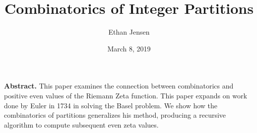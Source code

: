 \documentclass[12pt]{article}
\title{Combinatorics of Integer Partitions}
\author{Ethan Jensen}
\date{March 8, 2019}
\begin{document}
	\maketitle

\textbf{Abstract.} This paper examines the connection between combinatorics and positive even values of the Riemann Zeta function. This paper expands on work done by Euler in 1734 in solving the Basel problem. We show how the combinatorics of partitions generalizes his method, producing a recursive algorithm to compute subsequent even zeta values.
\end{document}
